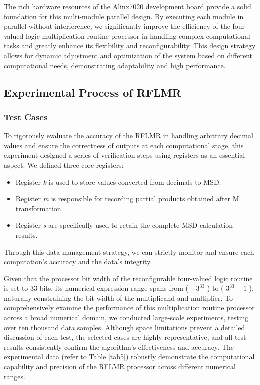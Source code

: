 \documentclass[electronics,article,accept,pdftex,moreauthors]{Definitions/mdpi}
\begin{document}
The rich hardware resources of the Alinx7020 development board provide a solid foundation for this multi-module parallel design. By executing each module in parallel without interference, we significantly improve the efficiency of the four-valued logic multiplication routine processor in handling complex computational tasks and greatly enhance its flexibility and reconfigurability. This design strategy allows for dynamic adjustment and optimization of the system based on different computational needs, demonstrating adaptability and high performance.
\subsection{Experimental Process of RFLMR}
\subsubsection{Test Cases}
To rigorously evaluate the accuracy of the RFLMR in handling arbitrary decimal values and ensure the correctness of outputs at each computational stage, this experiment designed a series of verification steps using registers as an essential aspect. We defined three core registers:
\begin{itemize}
    \item Register \textit{k} is used to store values converted from decimals to MSD.
    \item Register \textit{m }is responsible for recording partial products obtained after M transformation.
    \item Register \textit{s} are specifically used to retain the complete MSD calculation results.
\end{itemize}
Through this data management strategy, we can strictly monitor and ensure each computation's accuracy and the data's integrity.

Given that the processor bit width of the reconfigurable four-valued logic routine is set to 33 bits, its numerical expression range spans from ( $-3^{33}$ ) to ( $3^{33} - 1$ ), naturally constraining the bit width of the multiplicand and multiplier. To comprehensively examine the performance of this multiplication routine processor across a broad numerical domain, we conducted large-scale experiments, testing over ten thousand data samples. Although space limitations prevent a detailed discussion of each test, the selected cases are highly representative, and all test results consistently confirm the algorithm's effectiveness and accuracy. The experimental data (refer to Table \ref{tab5}) robustly demonstrate the computational capability and precision of the RFLMR processor across different numerical ranges.
\end{document}
